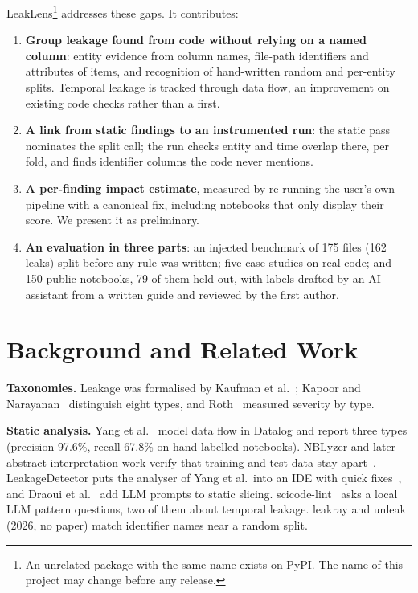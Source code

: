 \documentclass[10pt,a4paper,twocolumn]{article}
\newcommand{\tool}{LeakLens}
\begin{document}
\tool{}\footnote{An unrelated package with the same name exists on PyPI. The name of this project may change
before any release.} addresses these gaps. It contributes:
\begin{enumerate}
\item \textbf{Group leakage found from code without relying on a named column}: entity evidence from column
names, file-path identifiers and attributes of items, and recognition of hand-written random and per-entity
splits. Temporal leakage is tracked through data flow, an improvement on existing code checks rather than a first.
\item \textbf{A link from static findings to an instrumented run}: the static pass nominates the split call; the
run checks entity and time overlap there, per fold, and finds identifier columns the code never mentions.
\item \textbf{A per-finding impact estimate}, measured by re-running the user's own pipeline with a canonical fix,
including notebooks that only display their score. We present it as preliminary.
\item \textbf{An evaluation in three parts}: an injected benchmark of 175 files (162 leaks) split before any rule
was written; five case studies on real code; and 150 public notebooks, 79 of them held out, with labels drafted
by an AI assistant from a written guide and reviewed by the first author.
\end{enumerate}

\section{Background and Related Work}

\textbf{Taxonomies.} Leakage was formalised by Kaufman et al.~\cite{kaufman2012}; Kapoor and
Narayanan~\cite{kapoor2023} distinguish eight types, and Roth~\cite{roth2026} measured severity by type.

\textbf{Static analysis.} Yang et al.~\cite{yang2022} model data flow in Datalog and report three types (precision
97.6\%, recall 67.8\% on hand-labelled notebooks). NBLyzer and later abstract-interpretation work verify that
training and test data stay apart~\cite{subotic2022a,subotic2022b,drobnjakovic2024}. LeakageDetector puts the
analyser of Yang et al.\ into an IDE with quick fixes~\cite{alomar2025,truong2025}, and Draoui et
al.~\cite{draoui2026} add LLM prompts to static slicing. scicode-lint~\cite{samsonau2026} asks a local LLM pattern
questions, two of them about temporal leakage. leakray and unleak~\cite{leakray,unleak} (2026, no paper) match identifier names near a random split.
\end{document}
